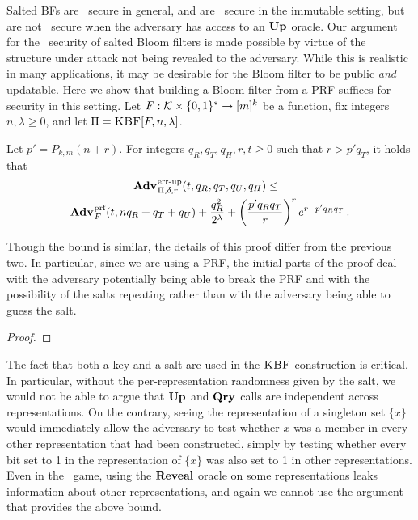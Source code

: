 Salted BFs are \erreps\ secure in general, and are \errep\ secure in the
immutable setting, but are not \errep\ secure when the adversary has access to
an $\textup{\textbf{Up}}\hspace{0.5pt}$ oracle. Our argument for the \erreps\ security of
salted Bloom filters is made possible by virtue of the structure under attack
not being revealed to the adversary. While this is realistic in many
applications, it may be desirable for the Bloom filter to be public \emph{and}
updatable.
%
Here we show that building a Bloom filter from a PRF suffices for security in
this setting.
%
Let $F:\mathcal{K}\times\{0,1\}^*\to[m]^k$ be a function, fix
integers~$n,\lambda\geq0$, and let $\Pi = \textnormal{\textsc{KBF}}[F,n,\lambda]$.

\begin{theorem}\label{thm:bf-key-bound}
  Let $p' = P_{k,m}(n+r)$.  For integers $q_R, q_T, q_H, r, t \geq 0$ such that
  $r > p'q_T$, it holds that
  \begin{equation*}
    \begin{aligned}
      \Adv{\errep}_{\Pi,\delta,r}(t,\,&q_R,q_T,q_U,q_H) \leq \\
        \Adv{\prf}_F(t,nq_R+q_T+q_U) & +
      \frac{q_R^2}{2^\lambda} +
      \left(\frac{p'q_Rq_T}{r}\right)^re^{r-p'q_Rq_T} \,.
    \end{aligned}
  \end{equation*}
\end{theorem}

Though the bound is similar, the details of this proof differ from the
previous two. In particular, since we are using a PRF, the initial parts of the
proof deal with the adversary potentially being able to break the PRF and with
the possibility of the salts repeating rather than with the adversary being able
to guess the salt.

\begin{proof}
  
\end{proof}

The fact that both a key and a salt are used in the $\textnormal{\textsc{KBF}}$ construction is
critical. In particular, without the per-representation randomness given by the
salt, we would not be able to argue that $\textup{\textbf{Up}}\hspace{0.5pt}$ and $\textup{\textbf{Qry}}\hspace{0.5pt}$ calls are
independent across representations. On the contrary, seeing the representation
of a singleton set $\{x\}$ would immediately allow the adversary to test whether
$x$ was a member in every other representation that had been constructed, simply
by testing whether every bit set to 1 in the representation of $\{x\}$ was also
set to 1 in other representations. Even in the \erreps\ game, using the $\mathbf{Reveal}$
oracle on some representations leaks information about other representations,
and again we cannot use the argument that provides the above bound.

